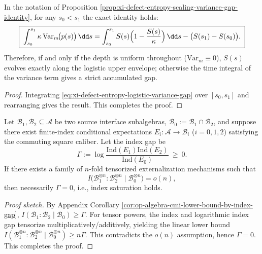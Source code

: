 \begin{corollary}\label{con:discussion-variance-gap-integral}
In the notation of Proposition \ref{prop:xi-defect-entropy-scaling-variance-gap-identity}, for any \(s_0<s_1\) the exact identity holds:
\[
\boxed{\;
\int_{s_0}^{s_1}\kappa\,\mathrm{Var}_{m}\!\bigl(p(s)\bigr)\,\dd s
=\int_{s_0}^{s_1}S(s)\Bigl(1-\frac{S(s)}{\kappa}\Bigr)\,\dd s-\bigl(S(s_1)-S(s_0)\bigr).\;}
\]
Therefore, if and only if the depth is uniform throughout (\(\mathrm{Var}_m\equiv 0\)), \(S(s)\) evolves exactly along the logistic upper envelope; otherwise the time integral of the variance term gives a strict accumulated gap.
\end{corollary}
\begin{proof}
Integrating \eqref{eq:xi-defect-entropy-logistic-variance-gap} over \([s_0,s_1]\) and rearranging gives the result. This completes the proof.
\end{proof}

\begin{proposition}\label{con:discussion-index-gap-strong-converse}
Let \(\mathcal{B}_1,\mathcal{B}_2\subseteq\mathcal{A}\) be two source interface subalgebras, \(\mathcal{B}_0:=\mathcal{B}_1\cap\mathcal{B}_2\), and suppose there exist finite-index conditional expectations \(E_i:\mathcal{A}\to\mathcal{B}_i\) (\(i=0,1,2\)) satisfying the commuting square caliber.
Let the index gap be
\[
\Gamma:=\log\frac{\mathrm{Ind}(E_1)\mathrm{Ind}(E_2)}{\mathrm{Ind}(E_0)}\ \ge\ 0.
\]
If there exists a family of \(n\)-fold tensorized externalization mechanisms such that
\[
I\bigl(\mathcal{B}_1^{\otimes n}:\mathcal{B}_2^{\otimes n}\mid\mathcal{B}_0^{\otimes n}\bigr)=o(n),
\]
then necessarily \(\Gamma=0\), i.e., index saturation holds.
\end{proposition}
\begin{proof}[Proof sketch]
By Appendix Corollary \ref{cor:op-algebra-cmi-lower-bound-by-index-gap},
\(
I(\mathcal{B}_1:\mathcal{B}_2\mid\mathcal{B}_0)\ge \Gamma
\).
For tensor powers, the index and logarithmic index gap tensorize multiplicatively/additively, yielding the linear lower bound
\(
I(\mathcal{B}_1^{\otimes n}:\mathcal{B}_2^{\otimes n}\mid\mathcal{B}_0^{\otimes n})\ge n\Gamma
\).
This contradicts the \(o(n)\) assumption, hence \(\Gamma=0\). This completes the proof.
\end{proof}

